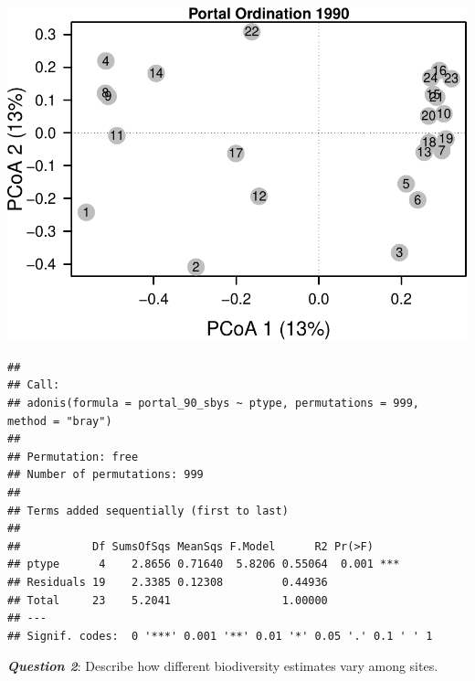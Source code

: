\documentclass[]{article}
\newenvironment{Shaded}{\begin{snugshade}}{\end{snugshade}}
\newcommand{\KeywordTok}[1]{\textcolor[rgb]{0.13,0.29,0.53}{\textbf{{#1}}}}
\newcommand{\DataTypeTok}[1]{\textcolor[rgb]{0.13,0.29,0.53}{{#1}}}
\newcommand{\DecValTok}[1]{\textcolor[rgb]{0.00,0.00,0.81}{{#1}}}
\newcommand{\FloatTok}[1]{\textcolor[rgb]{0.00,0.00,0.81}{{#1}}}
\newcommand{\StringTok}[1]{\textcolor[rgb]{0.31,0.60,0.02}{{#1}}}
\newcommand{\CommentTok}[1]{\textcolor[rgb]{0.56,0.35,0.01}{\textit{{#1}}}}
\newcommand{\NormalTok}[1]{{#1}}
\begin{document}
\includegraphics{temporal_assignment_files/figure-latex/unnamed-chunk-3-1.pdf}

\begin{Shaded}
\end{Shaded}

\begin{verbatim}
## 
## Call:
## adonis(formula = portal_90_sbys ~ ptype, permutations = 999,      method = "bray") 
## 
## Permutation: free
## Number of permutations: 999
## 
## Terms added sequentially (first to last)
## 
##           Df SumsOfSqs MeanSqs F.Model      R2 Pr(>F)    
## ptype      4    2.8656 0.71640  5.8206 0.55064  0.001 ***
## Residuals 19    2.3385 0.12308         0.44936           
## Total     23    5.2041                 1.00000           
## ---
## Signif. codes:  0 '***' 0.001 '**' 0.01 '*' 0.05 '.' 0.1 ' ' 1
\end{verbatim}

\textbf{\emph{Question 2}}: Describe how different biodiversity
estimates vary among sites.
\end{document}
